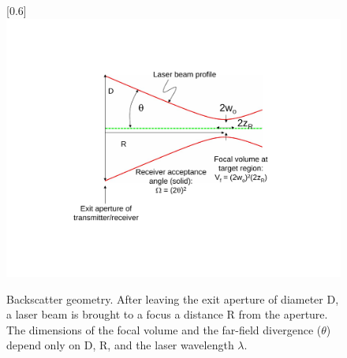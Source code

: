 \begin{figure}
\scalebox{0.6}[0.6]{
\includegraphics[bb=35 125 489 480]
{backscatter_figure/backscatter_figure.pdf}
}
\caption[Backscatter geometry]{Backscatter geometry. After leaving the exit aperture of diameter D, a laser beam is brought to a focus a distance R from the aperture. The dimensions of the focal volume and the far-field divergence ($\theta$) depend only on D, R, and the laser wavelength $\lambda$.}
\label{backscatter_figure}
\end{figure}
